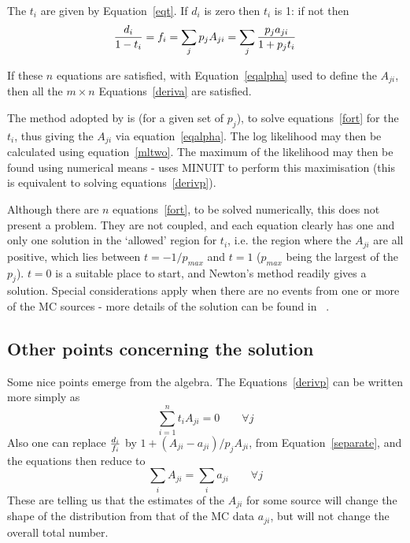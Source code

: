 The $t_i$ are given by Equation~\ref{eqt}. If $d_i$ is zero
then $t_i$ is 1: if not then
\begin{equation}
{d_i \over 1 - t_i} = f_i = \sum_j p_j A_{ji} = \sum_j {p_j a_{ji}
\over 1 + p_j t_i} \label{fort}
\end{equation}
 
If these $n$ equations are satisfied, with Equation~\ref{eqalpha}
used to define the $A_{ji}$, then all the $m \times n$
Equations~\ref{deriva} are satisfied.
 
 
The method adopted by  is (for a given set of $p_j$), to solve
equations~\ref{fort} for the $t_i$, thus giving the $A_{ji}$ via
equation~\ref{eqalpha}.  The log likelihood may then be calculated using
equation~\ref{mltwo}.  The maximum of the likelihood may then be found
using numerical means -  uses MINUIT to perform this maximisation
(this is equivalent to solving equations~\ref{derivp}).
 
Although there are $n$ equations~\ref{fort}, to be solved numerically,
this does not present a problem.  They are not coupled, and
each equation
clearly has one and only one solution in the `allowed' region for $t_i$,
i.e. the region where the $A_{ji}$ are all positive,
which lies between $t=-1/p_{max}$ and $t=1$
($p_{max}$ being the largest of the $p_j$).
$t=0$ is a suitable place to start, and Newton's method readily gives a
solution.
Special considerations apply when there are no events from one or more of the
MC sources - more details of the solution can be found in ~\cite{bib-FINITEMC}.
 
 
\subsection*{Other points concerning the solution}
 
Some nice points emerge from the algebra.
The Equations~\ref{derivp}  can be written more simply as
\begin{equation}
\sum_{i=1}^n t_i A_{ji}=0\qquad \forall j \label{newderivp}
\end{equation}
Also one can replace ${d_i \over  f_i}$ by $1+(A_{ji}-a_{ji})/p_j A_{ji}$,
from Equation~\ref{separate}, and the equations then reduce to
\begin{equation}
\sum_i A_{ji} = \sum_i a_{ji}\qquad \forall j\label{forp}
\end{equation}
These are telling us that the estimates of the $A_{ji}$ for some source will
change the shape of the distribution from that of the MC data $a_{ji}$,
but will not change the overall total number.
 
